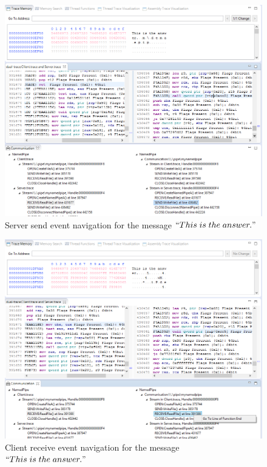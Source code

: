 \begin{figure}
\includegraphics[width=\textwidth]{Figures/result1_server_send}
 \caption{Server send event navigation for the message $``This\; is\; the\; answer."$}
\label{result1_server_send}
\end{figure}

\begin{figure}
\includegraphics[width=\textwidth]{Figures/result1_client_read}
 \caption{Client receive event navigation for the message $``This\; is\; the\; answer."$}
\label{result1_client_read}
\end{figure}

